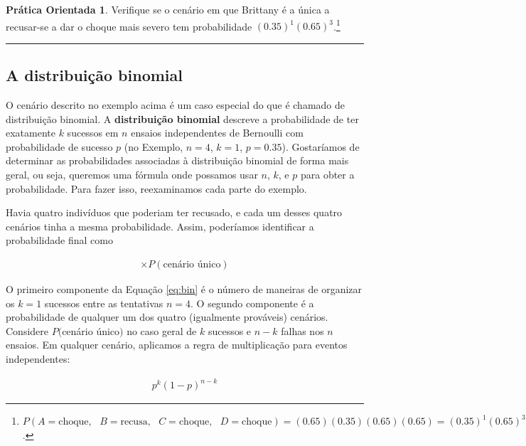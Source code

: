 \documentclass[
]{book}
\theoremstyle{definition}
\theoremstyle{definition}
\theoremstyle{definition}
\newtheorem{exercise}{Prática Orientada}[chapter]
\theoremstyle{definition}
\theoremstyle{remark}
\begin{document}
\begin{exercise}
\protect\hypertarget{exr:unnamed-chunk-127}{}{\label{exr:unnamed-chunk-127} }Verifique se o cenário em que Brittany é a única a recusar-se a dar o choque mais severo tem probabilidade \((0.35)^1(0.65)^3\).\footnote{\(P(A=\text{choque},\text{ }B=\text{recusa},\text{ }C=\text{choque},\text{ }D=\text{choque}) = (0.65)(0.35)(0.65)(0.65) = (0.35)^1(0.65)^3\).}
\end{exercise}

\begin{center}\rule{0.5\linewidth}{0.5pt}\end{center}

\hypertarget{theBinomialDistribution}{%
\subsection{A distribuição binomial}\label{theBinomialDistribution}}

O cenário descrito no exemplo acima é um caso especial do que é chamado de distribuição binomial. A \textbf{distribuição binomial} descreve a probabilidade de ter exatamente \(k\) sucessos em \(n\) ensaios independentes de Bernoulli com probabilidade de sucesso \(p\) (no Exemplo, \(n=4\), \(k=1\), \(p=0.35\)). Gostaríamos de determinar as probabilidades associadas à distribuição binomial de forma mais geral, ou seja, queremos uma fórmula onde possamos usar \(n\), \(k\), e \(p\) para obter a probabilidade. Para fazer isso, reexaminamos cada parte do exemplo.

Havia quatro indivíduos que poderiam ter recusado, e cada um desses quatro cenários tinha a mesma probabilidade. Assim, poderíamos identificar a probabilidade final como

\begin{eqnarray}
[\text{\# de cenários}] \times P(\text{cenário único})
\label{eq:bin}
\end{eqnarray}

O primeiro componente da Equação \eqref{eq:bin} é o número de maneiras de organizar os \(k=1\) sucessos entre as tentativas \(n=4\). O segundo componente é a probabilidade de qualquer um dos quatro (igualmente prováveis) cenários. Considere \(P(\)cenário único\()\) no caso geral de \(k\) sucessos e \(n-k\) falhas nos \(n\) ensaios. Em qualquer cenário, aplicamos a regra de multiplicação para eventos independentes:

\begin{eqnarray*}
p^k(1-p)^{n-k}
\end{eqnarray*}
\end{document}
